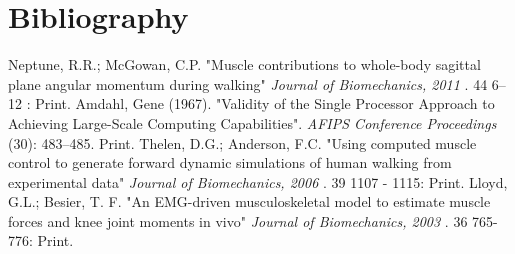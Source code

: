 



\section{Bibliography}

\begin{thebibliography}{99}
 Neptune, R.R.; McGowan, C.P. 
	"Muscle contributions to whole-body sagittal plane angular momentum during walking" 
	{ \em Journal of Biomechanics, 2011 }. 44 6–12 : Print.
 Amdahl, Gene (1967). "Validity of the Single Processor Approach to Achieving Large-Scale Computing Capabilities". {\em AFIPS Conference Proceedings} (30): 483–485. Print.
 Thelen, D.G.; Anderson, F.C. "Using computed muscle control to generate forward dynamic simulations of human walking from experimental data"
	{ \em Journal of Biomechanics, 2006 }. 39 1107 - 1115: Print.
 Lloyd, G.L.; Besier, T. F.
	"An EMG-driven musculoskeletal model to estimate muscle forces and knee joint moments in vivo"
	{ \em  Journal of Biomechanics, 2003 }. 36 765-776: Print.
\end{thebibliography}
